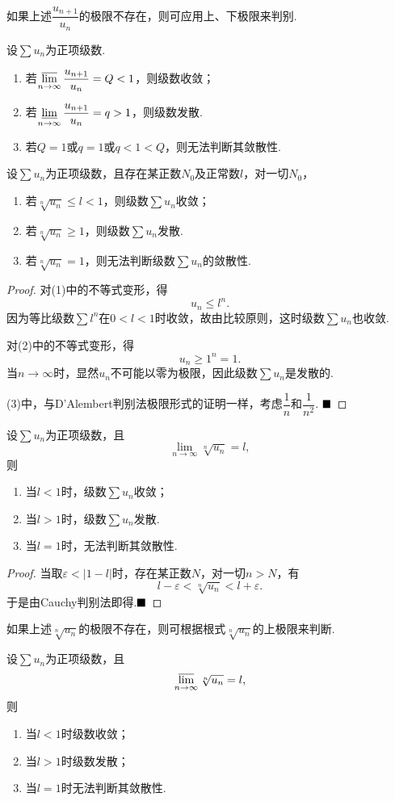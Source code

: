 如果上述$\dfrac{u_{n+1}}{u_n}$的极限不存在，则可应用上、下极限来判别.
\begin{corollary}
	设$\sum u_n$为正项级数.
	\begin{enumerate}[(1)]
		\item 若$\varlimsup\limits_{n\to\infty}\dfrac{u_{n+1}}{u_n}=Q<1$，则级数收敛；
		\item 若$\varliminf\limits_{n\to\infty}\dfrac{u_{n+1}}{u_n}=q>1$，则级数发散.
		\item 若$Q=1$或$q=1$或$q<1<Q$，则无法判断其敛散性.
	\end{enumerate}
\end{corollary}
\begin{theorem}[Cauchy根式判别法]
	设$\sum u_n$为正项级数，且存在某正数$N_0$及正常数$l$，对一切$N_0$，
	\begin{enumerate}[(1)]
		\item 若$\sqrt[n]{u_n}\leqslant l<1$，则级数$\sum u_n$收敛；
		\item 若$\sqrt[n]{u_n}\geqslant 1$，则级数$\sum u_n$发散.
		\item 若$\sqrt[n]{u_n}=1$，则无法判断级数$\sum u_n$的敛散性.
	\end{enumerate}
\end{theorem}
\begin{proof}
	对(1)中的不等式变形，得
	$$u_n\leqslant l^n.$$
	因为等比级数$\sum l^n$在$0<l<1$时收敛，故由比较原则，这时级数$\sum u_n$也收敛.
	
	对(2)中的不等式变形，得
	$$u_n\geqslant 1^n=1.$$
	当$n\to\infty$时，显然$u_n$不可能以零为极限，因此级数$\sum u_n$是发散的.
	
	(3)中，与D'Alembert判别法极限形式的证明一样，考虑$\dfrac{1}{n}$和$\dfrac{1}{n^2}$.
	$\hfill\blacksquare$
\end{proof}
\begin{corollary}[Cauchy判别法的极限形式]
	设$\sum u_n$为正项级数，且
	$$\lim\limits_{n\to\infty}\sqrt[n]{u_n}=l,$$
	则
	\begin{enumerate}[(1)]
		\item 当$l<1$时，级数$\sum u_n$收敛；
		\item 当$l>1$时，级数$\sum u_n$发散.
		\item 当$l=1$时，无法判断其敛散性.
	\end{enumerate}
\end{corollary}
\begin{proof}
	当取$\varepsilon<|1-l|$时，存在某正数$N$，对一切$n>N$，有
	$$l-\varepsilon<\sqrt[n]{u_n}<l+\varepsilon.$$
	于是由Cauchy判别法即得.$\hfill\blacksquare$
\end{proof}
如果上述$\sqrt[n]{u_n}$的极限不存在，则可根据根式$\sqrt[n]{u_n}$的上极限来判断.
\begin{corollary}
	设$\sum u_n$为正项级数，且
	$$\varlimsup\limits_{n\to\infty}\sqrt[n]{u_n}=l,$$
	则
	\begin{enumerate}[(1)]
		\item 当$l<1$时级数收敛；
		\item 当$l>1$时级数发散；
		\item 当$l=1$时无法判断其敛散性.
	\end{enumerate}
\end{corollary}
